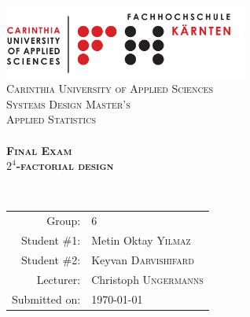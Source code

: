 \begin{titlepage}
    \begin{center}
        \includegraphics[width=0.60\textwidth]{../pics/FH}\\[1.5cm]

        \textsc{\LARGE Carinthia University of Applied Sciences}\\[1.5cm]

        \textsc{\Large Systems Design Master's}\\[1.5cm]
        \textsc{\Large Applied Statistics}\\[2cm]

        \HRule \\[1cm]

        { \Large \bfseries \textsc{ Final Exam}}\\
        \hfill \break
        { \Large \bfseries \textsc{ $2^4$-factorial design}}

        \HRule \\[2mm]

        \vspace{2cm}
	
        	\begin{table}[H]
        		\centering
        		\begin{tabular}{|r|l|}
        			\toprule
        			Group: & 6 \\
        			Student \#1: & Metin Oktay \textsc{Yilmaz} \\
        			Student \#2: & Keyvan \textsc{Darvishifard} \\
        			\midrule
        			Lecturer: & Christoph  \textsc{Ungermanns}  \\
        			Submitted on: & {\large \today}  	\\
        			\bottomrule
        		\end{tabular}
        	\end{table}
    \end{center}
\end{titlepage}